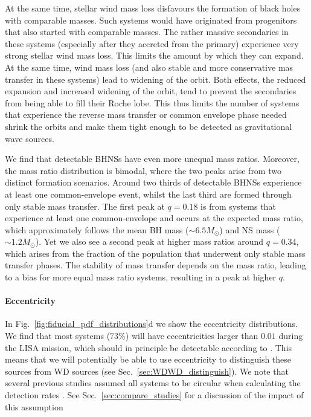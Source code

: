 At the same time, stellar wind mass loss disfavours the formation of black holes with comparable masses. Such systems would have originated from progenitors that also started with comparable masses. The rather massive secondaries in these systems (especially after they accreted from the primary) experience very strong stellar wind mass loss. This limits the amount by which they can expand. At the same time, wind mass loss (and also stable and more conservative mas transfer in these systems) lead to widening of the orbit. Both effects, the reduced expansion and increased widening of the orbit, tend to prevent the secondaries from being able to fill their Roche lobe. This thus limits the number of systems that experience the reverse mass transfer or common envelope phase needed shrink the orbits and make them tight enough to be detected as gravitational wave sources.

We find that detectable BHNSs have even more unequal mass ratios. Moreover, the mass ratio distribution is bimodal, where the two peaks arise from two distinct formation scenarios. Around two thirds of detectable BHNSs experience at least one common-envelope event, whilst the last third are formed through only stable mass transfer. The first peak at $q = 0.18$ is from systems that experience at least one common-envelope and occurs at the expected mass ratio, which approximately follows the mean BH mass ($\sim 6.5 \unit{M_\odot}$) and NS mass ($\sim 1.2 \unit{M_\odot}$). Yet we also see a second peak at higher mass ratios around $q = 0.34$, which arises from the fraction of the population that underwent only stable mass transfer phases. The stability of mass transfer depends on the mass ratio, leading to a bias for more equal mass ratio systems, resulting in a peak at higher $q$.

\paragraph{Eccentricity} In Fig.~\ref{fig:fiducial_pdf_distributions}d we show the eccentricity distributions. We find that most systems (73\%) will have eccentricities larger than $0.01$ during the LISA mission, which should in principle be detectable according to \citet{Nishizawa+2016}. This means that we will potentially be able to use eccentricity to distinguish these sources from WD sources (see Sec.~\ref{sec:WDWD_distinguish}). We note that several previous studies assumed all systems to be circular when calculating the detection rates \citep[e.g.][]{Liu+2014, Lamberts+2018, Sesana+2020}. 
See Sec.~\ref{sec:compare_studies} for a discussion of the impact of this assumption

